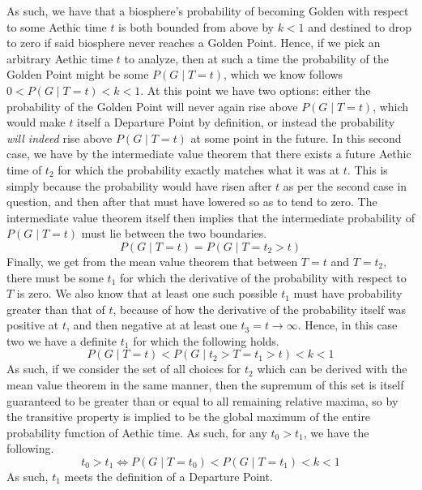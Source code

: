 As such, we have that a biosphere's probability of becoming Golden with respect to some Aethic time $t$ is both bounded from above by $k < 1$ and destined to drop to zero if said biosphere never reaches a Golden Point. Hence, if we pick an arbitrary Aethic time $t$ to analyze, then at such a time the probability of the Golden Point might be some $P \! \left( G \mid T = t \right)$, which we know follows $0 < P \! \left( G \mid T = t \right) < k < 1$. At this point we have two options: either the probability of the Golden Point will never again rise above $P \! \left( G \mid T = t \right)$, which would make $t$ itself a Departure Point by definition, or instead the probability \textit{will indeed} rise above $P \! \left( G \mid T = t \right)$ at some point in the future. In this second case, we have by the intermediate value theorem that there exists a future Aethic time of $t_2$ for which the probability exactly matches what it was at $t$. This is simply because the probability would have risen after $t$ as per the second case in question, and then after that must have lowered so as to tend to zero. The intermediate value theorem itself then implies that the intermediate probability of $P \! \left( G \mid T = t \right)$ must lie between the two boundaries.
\begin{equation}
    P \! \left( G \mid T = t \right) = P \! \left( G \mid T = t_2 > t \right)
\end{equation}
Finally, we get from the mean value theorem that between $T=t$ and $T=t_2$, there must be some $t_1$ for which the derivative of the probability with respect to $T$ is zero. We also know that at least one such possible $t_1$ must have probability greater than that of $t$, because of how the derivative of the probability itself was positive at $t$, and then negative at at least one $t_3 = t \to \infty$. Hence, in this case two we have a definite $t_1$ for which the following holds. 
\begin{equation}
    P \! \left( G \mid T = t \right) < P \! \left( G \mid t_2 > T = t_1 > t \right) < k < 1
\end{equation}
As such, if we consider the set of all choices for $t_2$ which can be derived with the mean value theorem in the same manner, then the supremum of this set is itself guaranteed to be greater than or equal to all remaining relative maxima, so by the transitive property is implied to be the global maximum of the entire probability function of Aethic time. As such, for any $t_0 > t_1$, we have the following.
\begin{equation}
    t_0 > t_1 \Leftrightarrow P \! \left( G \mid T = t_0 \right) < P \! \left( G \mid T = t_1 \right) < k < 1
\end{equation}
As such, $t_1$ meets the definition of a Departure Point.

